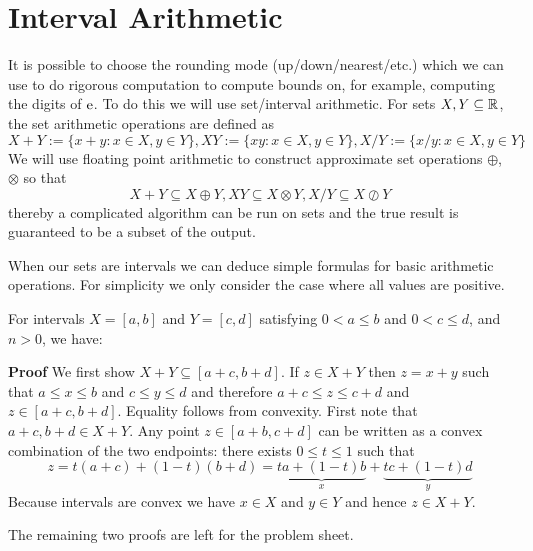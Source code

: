 
\section{Interval Arithmetic}
It is possible to choose the rounding mode (up/down/nearest/etc.) which we can use to do rigorous computation to compute bounds on, for example, computing the digits of ${\rm e}$. To do this we will use set/interval arithmetic. For sets $X,Y \subseteq {\mathbb R}$, the set arithmetic operations are defined as
\[
X + Y := \{x + y : x \ensuremath{\in} X, y \ensuremath{\in} Y\}, XY := \{xy : x \ensuremath{\in} X, y \ensuremath{\in} Y\}, X/Y := \{x/y : x \ensuremath{\in} X, y \ensuremath{\in} Y\}
\]
We will use floating point arithmetic to construct approximate set operations \ensuremath{\oplus}, \ensuremath{\otimes} so that
\[
  X + Y \ensuremath{\subseteq} X \ensuremath{\oplus} Y, XY \ensuremath{\subseteq} X \ensuremath{\otimes} Y, X/Y \ensuremath{\subseteq} X \ensuremath{\oslash} Y
\]
thereby a complicated algorithm can be run on sets and the true result is guaranteed to be a subset of the output.

When our sets are intervals we can deduce simple formulas for basic arithmetic operations. For simplicity we only consider the case where all values are positive.

\begin{proposition} For intervals  $X = [a,b]$ and $Y = [c,d]$ satisfying $0 < a \ensuremath{\leq} b$ and $0 < c \ensuremath{\leq} d$, and $n > 0$, we have:
\end{proposition}
\textbf{Proof} We first show $X+Y \ensuremath{\subseteq} [a+c,b+d]$. If $z \ensuremath{\in} X + Y$ then $z = x+y$ such that $a \ensuremath{\leq} x \ensuremath{\leq} b$ and $c \ensuremath{\leq} y \ensuremath{\leq} d$ and therefore $a + c \ensuremath{\leq} z \ensuremath{\leq} c + d$ and $z \ensuremath{\in} [a+c,b+d]$. Equality follows from convexity. First note that $a+c, b+d \ensuremath{\in} X+Y$. Any point $z \ensuremath{\in}  [a+b,c+d]$ can be written  as a convex combination of the two endpoints: there exists $0 \ensuremath{\leq} t \ensuremath{\leq} 1$ such that
\[
z = t (a+c) + (1-t) (b+d) =  \underbrace{t a + (1-t) b}_x + \underbrace{t c + (1-t) d}_y
\]
Because intervals are convex we have $x \ensuremath{\in} X$ and $y \ensuremath{\in} Y$ and hence $z \ensuremath{\in} X+Y$. 

The remaining two proofs are left for the problem sheet. 

